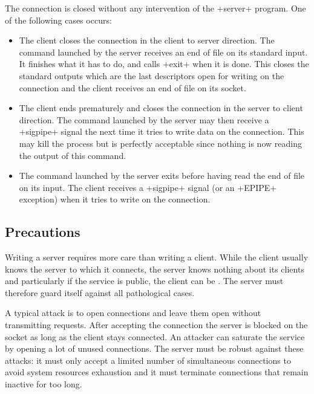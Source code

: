 The connection is closed without any intervention of the \ml+server+
program. One of the following cases occurs:
\begin{itemize}
\item The client closes the connection in the client to server
  direction. The command launched by the server receives an end of
  file on its standard input. It finishes what it has to do, and calls
  \ml+exit+ when it is done. This closes the standard outputs which
  are the last descriptors open for writing on the connection and the
  client receives an end of file on its socket.

\item The client ends prematurely and closes the connection in the
  server to client direction. The command launched by the server may
  then receive a \ml+sigpipe+ signal the next time it tries to write
  data on the connection. This may kill the process but is perfectly
  acceptable since nothing is now reading the output of this command.

\item The command launched by the server exits before having read the
  end of file on its input.  The client receives a \ml+sigpipe+ signal
  (or an \ml+EPIPE+ exception) when it tries to write on the
  connection.
\end{itemize}

\subsection*{Precautions}

Writing a server requires more care than writing a client. While the
client usually knows the server to which it connects, the server knows
nothing about its clients and particularly if the service is public,
the client can be . The server must therefore guard
itself against all pathological cases.

A typical attack is to open connections and leave them open without
transmitting requests. After accepting the connection the server is
blocked on the socket as long as the client stays connected. An
attacker can saturate the service by opening a lot of unused
connections. The server must be robust against these attacks: it must
only accept a limited number of simultaneous connections to avoid
system resources exhaustion and it must terminate connections that
remain inactive for too long. 


